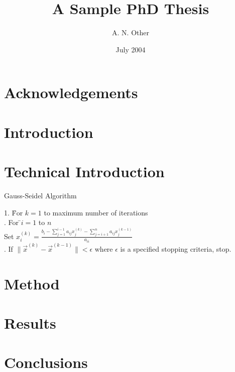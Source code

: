 \documentclass[a4paper,12pt]{report}
\begin{document}

\title{A Sample PhD Thesis}
\author{A. N. Other}
\date{July 2004}
\maketitle

\renewcommand{\baselinestretch}{1.66}

\tableofcontents
\listoffigures
\listoftables
{}

\chapter*{Acknowledgements}

\begin{abstract}
\end{abstract}


\chapter{Introduction}
\label{ch:intro}

\chapter{Technical Introduction}
\label{ch:techintro}

\begin{algorithm}
\caption{Gauss-Seidel Algorithm}

\begin{tabbing}
1. \=For $k=1$ to maximum number of iterations\\
. For \=$i=1$ to $n$\\
\>\>Set
\begin{math}
x_i^{(k)} = \frac{b_i-\sum_{j=1}^{i-1}a_{ij}x_j^{(k)}-\sum_{j=i+1}^{n}a_{ij}x_j^{(k-1)}}{a_{ii}}
\end{math}
\\
. If $\|\vec{x}^{(k)}-\vec{x}^{(k-1)}\| < \epsilon$ where $\epsilon$ is a specified stopping criteria, stop.
\end{tabbing}
\end{algorithm}

\chapter{Method}
\label{ch:method}

\chapter{Results}
\label{ch:results}

\chapter{Conclusions}
\label{ch:conc}



\end{document}
